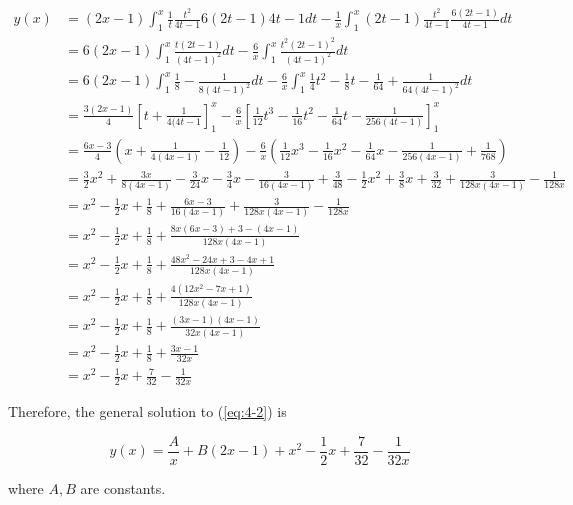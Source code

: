\documentclass{article}
\begin{document}
\begin{align*}
    y(x) &= (2x - 1)\int_1^x \frac{1}{t}\frac{t^2}{4t - 1}{6(2t - 1)}{4t - 1} dt
        - \frac{1}{x} \int_1^x (2t - 1)\frac{t^2}{4t - 1}\frac{6(2t - 1)}{4t - 1}dt\\
    &= 6(2x - 1)\int_1^x \frac{t(2t - 1)}{(4t - 1)^2} dt - \frac{6}{x} \int_1^x\frac{t^2(2t - 1)^2}{(4t - 1)^2} dt\\
    &= 6(2x - 1)\int_1^x \frac{1}{8} - \frac{1}{8(4t - 1)^2} dt
        - \frac{6}{x} \int_1^x \frac{1}{4}t^2 - \frac{1}{8}t - \frac{1}{64} + \frac{1}{64(4t - 1)^2} dt\\
    &= \frac{3(2x - 1)}{4} \left[t + \frac{1}{4(4t - 1}\right]_1^x
        - \frac{6}{x}\left[\frac{1}{12}t^3 - \frac{1}{16}t^2 - \frac{1}{64}t - \frac{1}{256(4t - 1)}\right]_1^x\\
    &= \frac{6x - 3}{4} \left(x + \frac{1}{4(4x - 1)} - \frac{1}{12}\right)
        - \frac{6}{x}\left(\frac{1}{12}x^3 - \frac{1}{16}x^2 - \frac{1}{64}x - \frac{1}{256(4x - 1)} + \frac{1}{768}\right)\\
    &= \frac{3}{2}x^2 + \frac{3x}{8(4x - 1)} - \frac{3}{24}x - \frac{3}{4}x - \frac{3}{16(4x - 1)} + \frac{3}{48}
        - \frac{1}{2}x^2 + \frac{3}{8}x + \frac{3}{32} + \frac{3}{128x(4x - 1)} - \frac{1}{128x}\\
    &= x^2 - \frac{1}{2}x + \frac{1}{8} + \frac{6x - 3}{16(4x - 1)} + \frac{3}{128x(4x - 1)} - \frac{1}{128x}\\
    &= x^2 - \frac{1}{2}x + \frac{1}{8} + \frac{8x(6x - 3) + 3 - (4x - 1)}{128x(4x - 1)}\\
    &= x^2 - \frac{1}{2}x + \frac{1}{8} + \frac{48x^2 - 24x + 3 - 4x + 1}{128x(4x - 1)}\\
    &= x^2 - \frac{1}{2}x + \frac{1}{8} + \frac{4(12x^2 - 7x + 1)}{128x(4x - 1)}\\
    &= x^2 - \frac{1}{2}x + \frac{1}{8} + \frac{(3x - 1)(4x - 1)}{32x(4x - 1)}\\
    &= x^2 - \frac{1}{2}x + \frac{1}{8} + \frac{3x - 1}{32x}\\
    &= x^2 - \frac{1}{2}x + \frac{7}{32} - \frac{1}{32x}
\end{align*}

Therefore, the general solution to (\ref{eq:4-2}) is

\begin{equation*}
    y(x) = \frac{A}{x} + B(2x - 1) + x^2 - \frac{1}{2}x + \frac{7}{32} - \frac{1}{32x}
\end{equation*}

where $A, B$ are constants.
\end{document}
